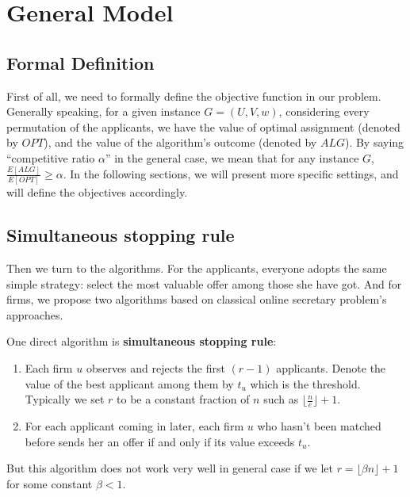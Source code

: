 \chapter{General Model}

\section{Formal Definition}

First of all, we need to formally define the objective function in our problem.
Generally speaking, for a given instance $G = (U, V, w)$, considering every permutation of the applicants,
we have the value of optimal assignment (denoted by $OPT$), and the value of the algorithm's outcome (denoted by $ALG$).
By saying ``competitive ratio $\alpha$'' in the general case, we mean that for any instance $G$, $\frac{E[ALG]}{E[OPT]} \ge \alpha$.
In the following sections, we will present more specific settings, and will define the objectives accordingly.

\section{Simultaneous stopping rule}

Then we turn to the algorithms.
For the applicants, everyone adopts the same simple strategy:
select the most valuable offer among those she have got.
And for firms, we propose two algorithms based on classical online
secretary problem's approaches.

One direct algorithm is \textbf{simultaneous stopping rule}:

\begin{enumerate}
    \item Each firm $u$ observes and rejects the first $(r - 1)$ applicants.
        Denote the value of the best applicant among them by $t_u$ which
        is the threshold. Typically we set $r$ to be a constant fraction of $n$
        such as $\lfloor \frac{n}{e} \rfloor + 1$.

    \item For each applicant coming in later, each firm $u$ who hasn't been
        matched before sends her an offer if and only if
        its value exceeds $t_u$.
\end{enumerate}

But this algorithm does not work very well in general case if
we let $r = \lfloor \beta n \rfloor + 1$ for some constant $\beta < 1$.


